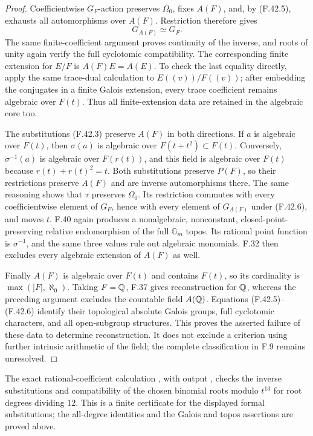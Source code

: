 \begin{proof}
Coefficientwise $G_F$-action preserves $\Omega_0$, fixes
$A(F)$, and, by (F.42.5), exhausts all automorphisms over
$A(F)$. Restriction therefore gives
\[
                          G_{A(F)}\simeq G_F.                \tag{F.42.6}
\]
The same finite-coefficient argument proves continuity of the
inverse, and roots of unity again verify the full cyclotomic
compatibility. The corresponding finite extension for $E/F$
is $A(F)E=A(E)$. To check the last equality directly, apply
the same trace-dual calculation to $E((v))/F((v))$; after
embedding the conjugates in a finite Galois extension, every
trace coefficient remains algebraic over $F(t)$. Thus all
finite-extension data are retained in the algebraic core too.

The substitutions (F.42.3) preserve $A(F)$ in both directions.
If $a$ is algebraic over $F(t)$, then $\sigma(a)$ is algebraic
over $F(t+t^2)\subset F(t)$. Conversely,
$\sigma^{-1}(a)$ is algebraic over $F(r(t))$, and this field
is algebraic over $F(t)$ because $r(t)+r(t)^2=t$.
Both substitutions preserve $P(F)$, so their restrictions
preserve $A(F)$ and are inverse automorphisms there.
The same reasoning shows that $\tau$ preserves $\Omega_0$.
Its restriction commutes with every coefficientwise element
of $G_F$, hence with every element of $G_{A(F)}$ under
(F.42.6), and moves $t$. F.40 again produces a nonalgebraic,
nonconstant, closed-point-preserving relative endomorphism
of the full $\mathbb G_m$ topos. Its rational point function
is $\sigma^{-1}$, and the same three values rule out algebraic
monomials. F.32 then excludes every algebraic extension of
$A(F)$ as well.

Finally $A(F)$ is algebraic over $F(t)$ and contains $F(t)$,
so its cardinality is $\max(|F|,\aleph_0)$. Taking $F=\mathbb Q$,
F.37 gives reconstruction for $\mathbb Q$, whereas the preceding
argument excludes the countable field $A(\mathbb Q)$. Equations
(F.42.5)--(F.42.6) identify their topological absolute Galois
groups, full cyclotomic characters, and all open-subgroup
structures. This proves the asserted failure of these data
to determine reconstruction. It does not exclude a criterion
using further intrinsic arithmetic of the field; the complete
classification in F.9 remains unresolved.
\end{proof}

The exact rational-coefficient calculation
, with output
, checks the inverse
substitutions and compatibility of the chosen binomial
roots modulo $t^{13}$ for root degrees dividing $12$.
This is a finite certificate for the displayed formal
substitutions; the all-degree identities and the Galois
and topos assertions are proved above.
